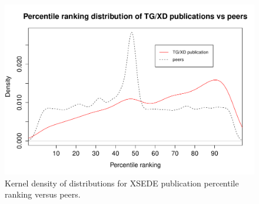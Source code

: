 \documentclass{sig-alternate}
\begin{document}
\begin{figure}[htb!]
  \centering 
    \includegraphics[width=1.0\columnwidth]{images-new/xd_peers_density.pdf} 
  \caption{Kernel density of distributions for XSEDE publication percentile ranking versus peers.}\label{F:xd_peers_density} 


\end{figure}
\end{document}
